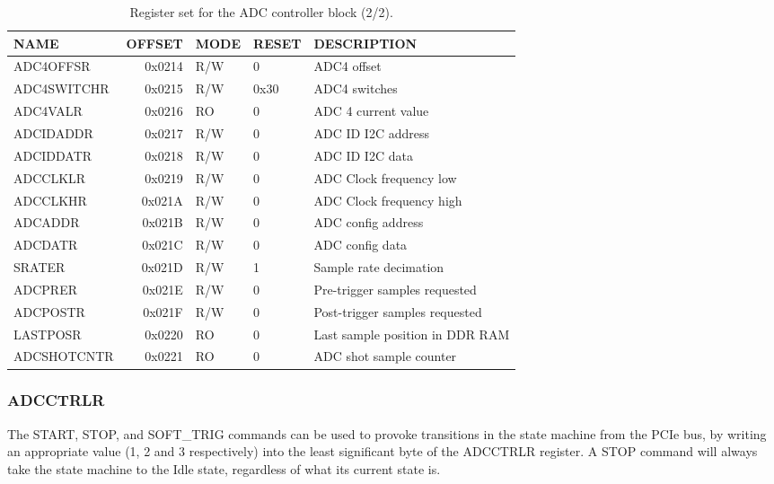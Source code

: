 \documentclass[a4paper]{article}
\begin{document}
\begin{table}[htbp]
  \centering
  \begin{tabularx}{\textwidth}{|l|r|l|l|X|}
    \hline
    \textbf{NAME} & \textbf{OFFSET} & \textbf{MODE} & \textbf{RESET} & \textbf{DESCRIPTION} \\
    \hline
    \hline
    ADC4OFFSR & 0x0214 & R/W & 0 & ADC4 offset \\
    \hline
    ADC4SWITCHR & 0x0215 & R/W & 0x30 & ADC4 switches \\
    \hline
    ADC4VALR & 0x0216 & RO & 0 & ADC 4 current value \\
    \hline
    ADCIDADDR & 0x0217 & R/W & 0 & ADC ID I2C address \\
    \hline
    ADCIDDATR & 0x0218 & R/W & 0 & ADC ID I2C data \\
    \hline
    ADCCLKLR & 0x0219 & R/W & 0 & ADC Clock frequency low \\
    \hline
    ADCCLKHR & 0x021A & R/W & 0 & ADC Clock frequency high \\
    \hline
    ADCADDR & 0x021B & R/W & 0 & ADC config address \\
    \hline
    ADCDATR & 0x021C & R/W & 0 & ADC config data \\
    \hline
    SRATER & 0x021D & R/W & 1 & Sample rate decimation \\
    \hline
    ADCPRER & 0x021E & R/W & 0 & Pre-trigger samples requested \\
    \hline
    ADCPOSTR & 0x021F & R/W & 0 & Post-trigger samples requested \\
    \hline
    LASTPOSR & 0x0220 & RO & 0 & Last sample position in DDR RAM\\
    \hline
    ADCSHOTCNTR & 0x0221 & RO & 0 & ADC shot sample counter \\
    \hline
  \end{tabularx}
  \caption{Register set for the ADC controller block (2/2).}
  \label{tab:adc_control2}
\end{table}

\subsubsection{ADCCTRLR}
The START, STOP, and SOFT\_TRIG commands can be used to provoke transitions in the state machine from the PCIe bus, by writing an appropriate value (1, 2 and 3 respectively) into the least significant byte of the ADCCTRLR register. A STOP command will always take the state machine to the Idle state, regardless of what its current state is.
\end{document}
